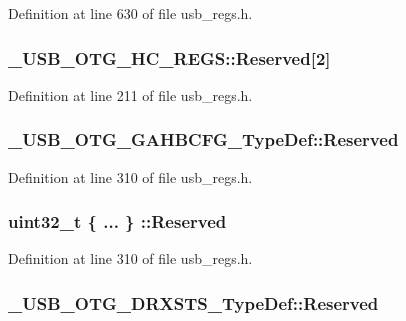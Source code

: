 Definition at line 630 of file usb\-\_\-regs.\-h.

\hypertarget{group___u_s_b___o_t_g___d_r_i_v_e_r_ga86ff2db88b93c1f102a1cfabc608c2ab}{
\subsubsection[{Reserved}]{ \-\_\-\-U\-S\-B\-\_\-\-O\-T\-G\-\_\-\-H\-C\-\_\-\-R\-E\-G\-S\-::\-Reserved\mbox{[}2\mbox{]}}}\label{group___u_s_b___o_t_g___d_r_i_v_e_r_ga86ff2db88b93c1f102a1cfabc608c2ab}


Definition at line 211 of file usb\-\_\-regs.\-h.

\hypertarget{group___u_s_b___o_t_g___d_r_i_v_e_r_ga44156423025612e25b7e6c0f473b5a50}{
\subsubsection[{Reserved}]{ \-\_\-\-U\-S\-B\-\_\-\-O\-T\-G\-\_\-\-G\-A\-H\-B\-C\-F\-G\-\_\-\-Type\-Def\-::\-Reserved}}\label{group___u_s_b___o_t_g___d_r_i_v_e_r_ga44156423025612e25b7e6c0f473b5a50}


Definition at line 310 of file usb\-\_\-regs.\-h.

\hypertarget{group___u_s_b___o_t_g___d_r_i_v_e_r_ga7984d179e1363b3b1b26eed565da8117}{
\subsubsection[{Reserved}]{\setlength{\rightskip}{0pt plus 5cm}uint32\-\_\-t \{ ... \} \-::Reserved}}\label{group___u_s_b___o_t_g___d_r_i_v_e_r_ga7984d179e1363b3b1b26eed565da8117}


Definition at line 310 of file usb\-\_\-regs.\-h.

\hypertarget{group___u_s_b___o_t_g___d_r_i_v_e_r_ga2822869911f2d6f53098a72f710dc2f6}{
\subsubsection[{Reserved}]{ \-\_\-\-U\-S\-B\-\_\-\-O\-T\-G\-\_\-\-D\-R\-X\-S\-T\-S\-\_\-\-Type\-Def\-::\-Reserved}}\label{group___u_s_b___o_t_g___d_r_i_v_e_r_ga2822869911f2d6f53098a72f710dc2f6}


